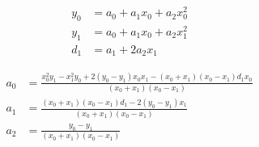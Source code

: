 \begin{align}
  y_0 & = a_0+a_1 x_0+a_2 x_0^{2}  \\
   y_1 & = a_0+a_1 x_0+a_2 x_1^{2}  \\
   d_1 & = a_1+2 a_2 x_1  
\end{align}

 
\begin{align}
  a_0 & = \frac
{x_0^{2} y_1 - x_1^{2} y_0+2  \left( y_0 - y_1 \right)  x_0 x_1 -  \left( x_0+x_1  \right)   \left( x_0 - x_1 \right)  d_1 x_0}
{ \left( x_0+x_1 \right)   \left(  x_0 - x_1 \right) } \\
   a_1 & = \frac
{ \left( x_0+x_1 \right)   \left( x_0 - x_1 \right)  d_1 -  2  \left( y_0 - y_1 \right)  x_1}
{ \left( x_0+x_1 \right)   \left( x_0 - x_1  \right) } \\
   a_2 & = \frac
{y_0 - y_1}
{ \left( x_0+x_1 \right)   \left( x_0  - x_1 \right) } 
\end{align}
